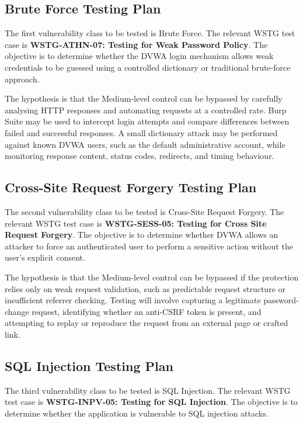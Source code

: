 \documentclass[11pt,a4paper]{report}
\begin{document}
    \subsection{Brute Force Testing Plan}

    The first vulnerability class to be tested is Brute Force. The relevant WSTG test case is \textbf{WSTG-ATHN-07: Testing for Weak Password Policy}. The objective is to determine whether the DVWA login mechanism allows weak credentials to be guessed using a controlled dictionary or traditional brute-force approach.

    The hypothesis is that the Medium-level control can be bypassed by carefully analysing HTTP responses and automating requests at a controlled rate. Burp Suite may be used to intercept login attempts and compare differences between failed and successful responses. A small dictionary attack may be performed against known DVWA users, such as the default administrative account, while monitoring response content, status codes, redirects, and timing behaviour.

    \subsection{Cross-Site Request Forgery Testing Plan}

    The second vulnerability class to be tested is Cross-Site Request Forgery. The relevant WSTG test case is \textbf{WSTG-SESS-05: Testing for Cross Site Request Forgery}. The objective is to determine whether DVWA allows an attacker to force an authenticated user to perform a sensitive action without the user's explicit consent.

    The hypothesis is that the Medium-level control can be bypassed if the protection relies only on weak request validation, such as predictable request structure or insufficient referrer checking. Testing will involve capturing a legitimate password-change request, identifying whether an anti-CSRF token is present, and attempting to replay or reproduce the request from an external page or crafted link.

    \subsection{SQL Injection Testing Plan}

    The third vulnerability class to be tested is SQL Injection. The relevant WSTG test case is \textbf{WSTG-INPV-05: Testing for SQL Injection}. The objective is to determine whether the application is vulnerable to SQL injection attacks.
\end{document}
